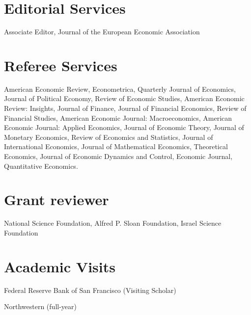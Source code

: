 \documentclass[line]{res}
\newenvironment{list1}{
  \begin{list}{\ding{113}}{%
      \setlength{\itemsep}{0.07in}
      \setlength{\parsep}{0in} \setlength{\parskip}{0in}
		\setlength{\topsep}{0.07in} \setlength{\partopsep}{0in}
      \setlength{\leftmargin}{0.0in}}}{\end{list}}
\begin{document}
\begin{resume}
\begin{list1}
\end{list1}
\section{\sc Editorial Services}
\begin{list1}
\item[2025-2026] Associate Editor, Journal of the European Economic Association
\end{list1}
\section{\sc Referee Services}
\begin{list1}
\item[] American Economic Review, Econometrica, Quarterly Journal of Economics, Journal of Political Economy, Review of Economic Studies, American Economic Review: Insights, Journal of Finance, Journal of Financial Economics, Review of Financial Studies, American Economic Journal: Macroeconomics, American Economic Journal: Applied Economics, Journal of Economic Theory, Journal of Monetary Economics, Review of Economics and Statistics, Journal of International Economics, Journal of Mathematical Economics, Theoretical Economics, Journal of Economic Dynamics and Control, Economic Journal, Quantitative Economics.

\end{list1}


\section{\sc Grant reviewer}
\begin{list1}
\item[] National Science Foundation, Alfred P. Sloan Foundation, Israel Science Foundation

\end{list1}

\section{\sc Academic Visits}


\begin{list1}
\item[2025] Federal Reserve Bank of San Francisco (Visiting Scholar)

\item[2023-2024] Northwestern (full-year)


\end{list1}
\end{resume}
\end{document}
